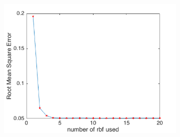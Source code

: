 \documentclass{article}
\begin{document}
\begin{enumerate}[label=(\alph*)]
\begin{figure}[t]
				 		\begin{subfigure}{0.5\textwidth}
				 			\includegraphics[width=\linewidth]{images/p1-3-a_1_20.png}
				 			\caption{}
				 			\label{fig:p-1-3-a_c}
				 		\end{subfigure}


\end{figure}
\end{enumerate}
\end{document}
